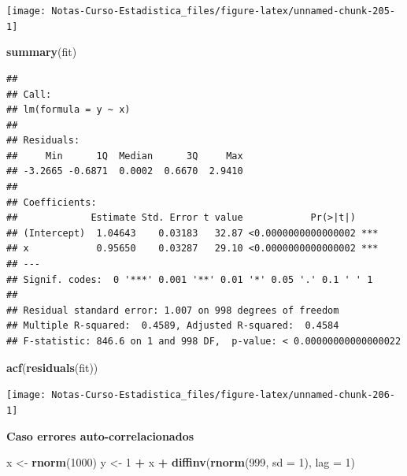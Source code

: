 \documentclass[
  12pt,
]{book}
\newenvironment{Shaded}{\begin{snugshade}}{\end{snugshade}}
\newcommand{\DataTypeTok}[1]{\textcolor[rgb]{0.13,0.29,0.53}{#1}}
\newcommand{\DecValTok}[1]{\textcolor[rgb]{0.00,0.00,0.81}{#1}}
\newcommand{\KeywordTok}[1]{\textcolor[rgb]{0.13,0.29,0.53}{\textbf{#1}}}
\newcommand{\NormalTok}[1]{#1}
\newcommand{\OperatorTok}[1]{\textcolor[rgb]{0.81,0.36,0.00}{\textbf{#1}}}
\newcommand{\StringTok}[1]{\textcolor[rgb]{0.31,0.60,0.02}{#1}}
\theoremstyle{definition}
\theoremstyle{definition}
\theoremstyle{definition}
\theoremstyle{remark}
\begin{document}
\begin{center}\texttt{[image: Notas-Curso-Estadistica\_files/figure-latex/unnamed-chunk-205-1]} \end{center}

\begin{Shaded}
\begin{Highlighting}[]
\KeywordTok{summary}\NormalTok{(fit)}
\end{Highlighting}
\end{Shaded}

\begin{verbatim}
## 
## Call:
## lm(formula = y ~ x)
## 
## Residuals:
##     Min      1Q  Median      3Q     Max 
## -3.2665 -0.6871  0.0002  0.6670  2.9410 
## 
## Coefficients:
##             Estimate Std. Error t value            Pr(>|t|)    
## (Intercept)  1.04643    0.03183   32.87 <0.0000000000000002 ***
## x            0.95650    0.03287   29.10 <0.0000000000000002 ***
## ---
## Signif. codes:  0 '***' 0.001 '**' 0.01 '*' 0.05 '.' 0.1 ' ' 1
## 
## Residual standard error: 1.007 on 998 degrees of freedom
## Multiple R-squared:  0.4589, Adjusted R-squared:  0.4584 
## F-statistic: 846.6 on 1 and 998 DF,  p-value: < 0.00000000000000022
\end{verbatim}

\begin{Shaded}
\begin{Highlighting}[]
\KeywordTok{acf}\NormalTok{(}\KeywordTok{residuals}\NormalTok{(fit))}
\end{Highlighting}
\end{Shaded}

\begin{center}\texttt{[image: Notas-Curso-Estadistica\_files/figure-latex/unnamed-chunk-206-1]} \end{center}

\textbf{Caso errores auto-correlacionados}

\begin{Shaded}
\begin{Highlighting}[]
\NormalTok{x <-}\StringTok{ }\KeywordTok{rnorm}\NormalTok{(}\DecValTok{1000}\NormalTok{)}
\NormalTok{y <-}\StringTok{ }\DecValTok{1} \OperatorTok{+}\StringTok{ }\NormalTok{x }\OperatorTok{+}\StringTok{ }\KeywordTok{diffinv}\NormalTok{(}\KeywordTok{rnorm}\NormalTok{(}\DecValTok{999}\NormalTok{, }\DataTypeTok{sd =} \DecValTok{1}\NormalTok{), }\DataTypeTok{lag =} \DecValTok{1}\NormalTok{)}
\end{Highlighting}
\end{Shaded}
\end{document}
